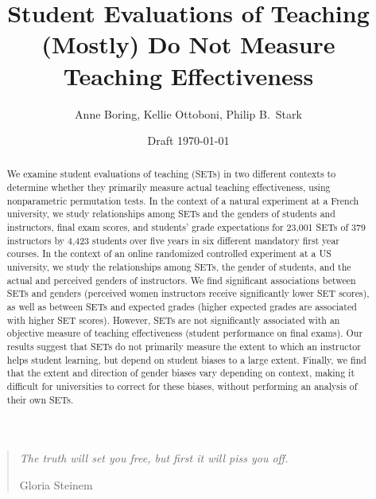 \documentclass[12pt]{article}
\title{Student Evaluations of Teaching (Mostly) Do Not Measure Teaching Effectiveness}
\author{Anne Boring, Kellie Ottoboni, Philip B.~Stark}
\date{Draft \today}
\begin{document}
\maketitle

\newpage
\begin{quotation}
    \emph{The truth will set you free, but first it will piss you off.}
    
     \hfill Gloria Steinem

\begin{abstract}

We examine student evaluations of teaching (SETs) in two different contexts to determine whether they primarily measure actual teaching effectiveness, using nonparametric permutation tests. In the context of a natural experiment at a French university, we study relationships among SETs and the genders of students and instructors, final exam scores, and students' grade expectations for 23,001 SETs of 379 instructors by 4,423 students over five years in six different mandatory first year courses.  In the context of an online randomized controlled experiment at a US university, we study the relationships among SETs, the gender of students, and the actual and perceived genders of instructors. We find significant associations between SETs and genders (perceived women instructors receive significantly lower SET scores), as well as between SETs and expected grades (higher expected grades are associated with higher SET scores). However, SETs are not significantly associated with an objective measure of teaching effectiveness (student performance on final exams). Our results suggest that SETs do not primarily measure the extent to which an instructor helps student learning, but depend on student biases to a large extent. Finally, we find that the extent and direction of gender biases vary depending on context, making it difficult for universities to correct for these biases, without performing an analysis of their own SETs. 



\end{abstract}
\end{quotation}
\end{document}
